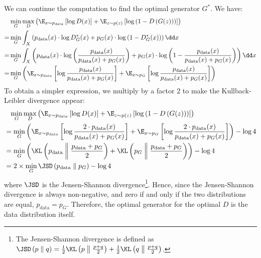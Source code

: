 We can continue the computation to find the optimal generator $G^*$. We have:
\begin{align*}
    &\min_G\max_D \left(
        \E_{x\sim p_{\text{data}}}\left[\log D(x)\right] + \E_{z\sim p(z)}\left[\log\left(1-D\left(G(z)\right)\right)\right]
    \right) \\
    = &\min_G
        \int_X \left( p_{\text{data}}(x)\cdot\log D^*_G(x) + p_G(x)\cdot\log\left(1-D^*_G(x)\right) \right) \dd x \\
    = &\min_G
        \int_X \left( p_{\text{data}}(x)\cdot\log\left(\frac{p_{\text{data}}(x)}{p_{\text{data}}(x) + p_G(x)}\right) + p_G(x)\cdot\log\left(1-\frac{p_{\text{data}}(x)}{p_{\text{data}}(x) + p_G(x)}\right) \right) \dd x \\
    = &\min_G
        \left( \E_{x\sim p_{\text{data}}}\left[\log\frac{p_{\text{data}}(x)}{p_{\text{data}}(x) + p_G(x)}\right] + \E_{x\sim p_G}\left[\log \frac{p_{\text{data}}(x)}{p_{\text{data}}(x) + p_G(x)}\right] \right) \\
\end{align*}
To obtain a simpler expression, we multiply by a factor $2$ to make the Kullback-Leibler divergence appear:
\begin{align*}
    &\phantom{=}\min_G\max_D \left(
        \E_{x\sim p_{\text{data}}}\left[\log D(x)\right] + \E_{z\sim p(z)}\left[\log\left(1-D\left(G(z)\right)\right)\right]
    \right) \\
    &=\min_G
        \left( \E_{x\sim p_{\text{data}}}\left[\log\frac{2\cdot p_{\text{data}}(x)}{p_{\text{data}}(x) + p_G(x)}\right] + \E_{x\sim p_G}\left[\log \frac{2\cdot p_{\text{data}}(x)}{p_{\text{data}}(x) + p_G(x)}\right]\right) - \log4 \\
    &= \min_G
        \left(\KL\left(
            p_{\text{data}}\;\middle\|\;\frac{p_{\text{data}}+p_G}{2}
        \right) + \KL\left(
            p_G\;\middle\|\;\frac{p_{\text{data}}+p_G}{2}
        \right)\right) - \log4 \\
    &= 2\times\min_G \JSD\left(p_{\text{data}}\;\middle\|\; p_G\right) - \log4 \\
\end{align*}
where $\JSD$ is the Jensen-Shannon divergence\footnote{
    The Jensen-Shannon divergence is defined as $\JSD\left(p\;\middle\|\; q\right) = \frac{1}{2}\KL\left(p\;\middle\|\;\frac{p+q}{2}\right) + \frac{1}{2}\KL\left(q\;\middle\|\;\frac{p+q}{2}\right)$.
}.
Hence, since the Jensen-Shannon divergence is always non-negative, and zero if and only if the two distributions are equal, $p_{\text{data}} = p_G$. Therefore, the optimal generator for the optimal $D$ is the data distribution itself.

